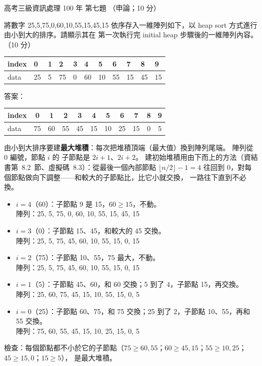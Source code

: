 \begin{pastexam}[label={px:gk3-100-ds-07}]{高考三級資訊處理 100 年 第七題}
（申論；10 分）

將數字 25,5,75,0,60,10,55,15,45,15 依序存入一維陣列如下，以 heap sort 方式進行由小到大的排序。請顯示其在
第一次執行完 initial heap 步驟後的一維陣列內容。（10 分）
\begin{center}
\begin{tabular}{|l|*{10}{l|}}
\hline
index & 0 & 1 & 2 & 3 & 4 & 5 & 6 & 7 & 8 & 9 \\ \hline
data & 25 & 5 & 75 & 0 & 60 & 10 & 55 & 15 & 45 & 15 \\ \hline
\end{tabular}
\end{center}
\end{pastexam}

\begin{pastsoln}
答案：
\begin{center}
\begin{tabular}{|l|*{10}{c|}}
\hline
index & 0 & 1 & 2 & 3 & 4 & 5 & 6 & 7 & 8 & 9 \\ \hline
data & 75 & 60 & 55 & 45 & 15 & 10 & 25 & 15 & 0 & 5 \\ \hline
\end{tabular}
\end{center}

由小到大排序要建\textbf{最大堆積}：每次把堆積頂端（最大值）換到陣列尾端。 陣列從 $0$ 編號，節點 $i$ 的
子節點是 $2i+1$、$2i+2$。 建初始堆積用由下而上的方法（資結書第~8.2~節、虛擬碼~8.3）：從最後一個內部節點
$\lfloor n/2 \rfloor - 1 = 4$ 往回到 $0$，對每個節點做向下調整——和較大的子節點比，比它小就交換，
一路往下直到不必換。

\begin{itemize}
\item $i = 4$（60）：子節點 $9$ 是 15，$60 \ge 15$，不動。\\
陣列：25, 5, 75, 0, 60, 10, 55, 15, 45, 15
\item $i = 3$（0）：子節點 15、45，和較大的 45 交換。\\
陣列：25, 5, 75, 45, 60, 10, 55, 15, 0, 15
\item $i = 2$（75）：子節點 10、55，$75$ 最大，不動。\\
陣列：25, 5, 75, 45, 60, 10, 55, 15, 0, 15
\item $i = 1$（5）：子節點 45、60，和 60 交換；5 到了 $4$，子節點 15，再交換。\\
陣列：25, 60, 75, 45, 15, 10, 55, 15, 0, 5
\item $i = 0$（25）：子節點 60、75，和 75 交換；25 到了 $2$，子節點 10、55，再和 55 交換。\\
陣列：75, 60, 55, 45, 15, 10, 25, 15, 0, 5
\end{itemize}
檢查：每個節點都不小於它的子節點（$75 \ge 60, 55$；$60 \ge 45, 15$；$55 \ge 10, 25$；$45 \ge 15, 0$；$15 \ge 5$），
是最大堆積。
\end{pastsoln}
